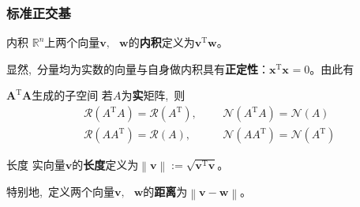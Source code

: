 \documentclass[10pt, a4paper, oneside, fontset=none]{ctexart}
\theoremstyle{plain}
\theoremstyle{definition}
\newcommand{\com}{,\,\,\,\:}
\newcommand{\de}[2][]{\begin{defil}{#1}\kai #2\end{defil}}
\newcommand{\di}[2][]{\begin{theo}{#1}\run #2\end{theo}}
\newcommand{\R}{\mathbb{R}}
\newcommand{\tboba}[1]{\textbf{\kai\color{bali!75!black}#1}}
\newcommand{\neiji}[4]{\boldsymbol{#1}_{#3}^\mathrm{T}\boldsymbol{#2}_{#4}}
\begin{document}
\subsubsection{标准正交基}
\de[内积]{
    $\R^n$上两个向量$\boldsymbol{v}\com \boldsymbol{w}$的\tboba{内积}定义为$\boldsymbol{v}^\mathrm{T}\boldsymbol{w}$。
}
显然\com 分量均为实数的向量与自身做内积具有\tboba{正定性}：$\neiji{x}{x}{}{}=0$。由此有
\di[$\boldsymbol{A^\mathrm{T}A}$生成的子空间]{
    若$A$为\textbf{实}矩阵\com 则
    \begin{equation*}
        \begin{aligned}
            &\mathcal{R}(A^\mathrm{T}A)=\mathcal{R}(A^\mathrm{T})\com 
            &&\mathcal{N}(A^\mathrm{T}A)=\mathcal{N}(A)\\
            &\mathcal{R}(AA^\mathrm{T})=\mathcal{R}(A)\com 
            &&\mathcal{N}(AA^\mathrm{T})=\mathcal{N}(A^\mathrm{T})
        \end{aligned}
    \end{equation*}
}
\de[长度]{
    实向量$\boldsymbol{v}$的\tboba{长度}定义为$\left\lVert \boldsymbol{v}\right\rVert :=\sqrt{\boldsymbol{v}^\mathrm{T}\boldsymbol{v}}$。
}
特别地\com 定义两个向量$\boldsymbol{v}\com \boldsymbol{w}$的\tboba{距离}为$\left\lVert \boldsymbol{v}-\boldsymbol{w}\right\rVert $。
\end{document}
